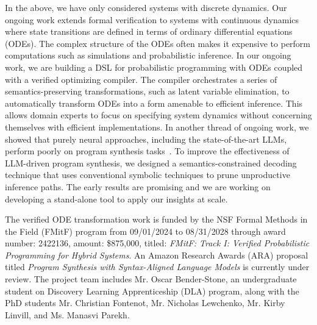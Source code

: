  In the above, we have only considered systems with
discrete dynamics. Our ongoing work extends formal verification to systems
with continuous dynamics where state transitions are defined in terms of
ordinary differential equations (ODEs). The complex structure of the ODEs
often makes it expensive to perform computations such as simulations and
probabilistic inference. In our ongoing work, we are building a DSL for
probabilistic programming with ODEs coupled with a verified optimizing
compiler. The compiler orchestrates a series of semantics-preserving
transformations, such as latent variable elimination, to automatically
transform ODEs into a form amenable to efficient inference. This allows
domain experts to focus on specifying system dynamics without concerning
themselves with efficient implementations. In another thread of ongoing
work, we showed that purely neural approaches, including the
state-of-the-art LLMs, perform poorly on program synthesis
tasks~\cite{roberson-arxiv2024}. To improve the effectiveness of LLM-driven
program synthesis, we designed a semantics-constrained decoding technique
that uses conventional symbolic techniques to prune unproductive inference
paths. The early results are promising and we are working on developing a
stand-alone tool to apply our insights at scale. 

 The verified ODE transformation
work is funded by the NSF Formal Methods in the Field (FMitF) program from
09/01/2024 to 08/31/2028 through award number: 2422136, amount: \$875,000,
titled: \emph{FMitF: Track I: Verified Probabilistic Programming for Hybrid
Systems}. An Amazon Research Awards (ARA) proposal titled \emph{Program
Synthesis with Syntax-Aligned Language Models} is currently under review.
The project team includes Mr. Oscar Bender-Stone, an undergraduate student
on Discovery Learning Apprenticeship (DLA) program, along with the PhD
students Mr. Christian Fontenot, Mr. Nicholas Lewchenko, Mr. Kirby Linvill,
and Ms. Manasvi Parekh. 



